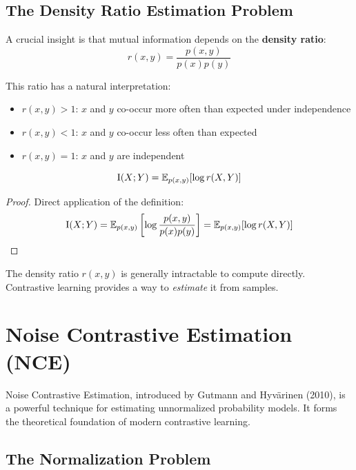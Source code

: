 \begin{notechapter}
\subsection{The Density Ratio Estimation Problem}

A crucial insight is that mutual information depends on the \textbf{density ratio}:
\begin{equation}
r(x, y) = \frac{p(x, y)}{p(x)p(y)}
\end{equation}

This ratio has a natural interpretation:
\begin{itemize}
    \item $r(x,y) > 1$: $x$ and $y$ co-occur more often than expected under independence
    \item $r(x,y) < 1$: $x$ and $y$ co-occur less often than expected
    \item $r(x,y) = 1$: $x$ and $y$ are independent
\end{itemize}

\begin{proposition}
\begin{equation}
\mathrm{I}(X; Y) = \mathbb{E}_{p(x,y)}[\log r(X, Y)]
\end{equation}
\end{proposition}

\begin{proof}
Direct application of the definition:
\begin{equation}
\mathrm{I}(X;Y) = \mathbb{E}_{p(x,y)}\left[\log \frac{p(x,y)}{p(x)p(y)}\right] = \mathbb{E}_{p(x,y)}[\log r(X,Y)]
\end{equation}
\end{proof}

The density ratio $r(x,y)$ is generally intractable to compute directly. Contrastive learning provides a way to \emph{estimate} it from samples.

\section{Noise Contrastive Estimation (NCE)}

Noise Contrastive Estimation, introduced by Gutmann and Hyvärinen (2010), is a powerful technique for estimating unnormalized probability models. It forms the theoretical foundation of modern contrastive learning.

\subsection{The Normalization Problem}


\end{notechapter}
